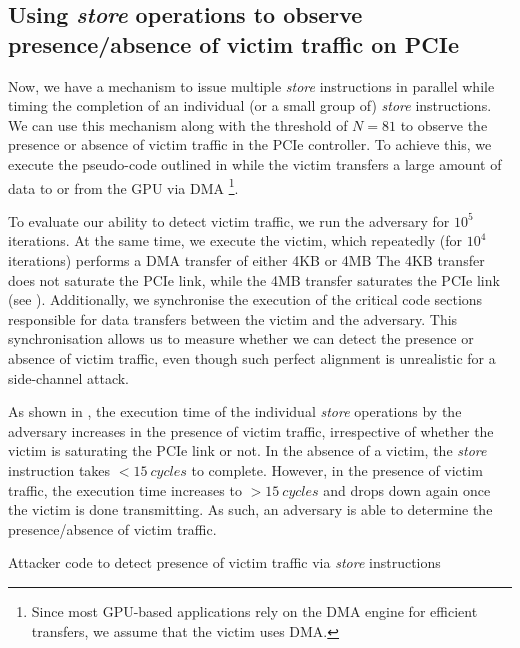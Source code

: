 \subsection{Using \textit{store} operations to observe presence/absence of victim traffic on PCIe}
\label{subsec:interconnect-sc-store-ops-measuring-time}
Now, we have a mechanism to issue multiple \textit{store} instructions in parallel while timing the completion of an individual (or a small group of) \textit{store} instructions.
We can use this mechanism along with the threshold of $N = 81$ to observe the presence or absence of victim traffic in the PCIe controller.
To achieve this, we execute the pseudo-code outlined in  while the victim transfers a large amount of data to or from the GPU via DMA
\footnote{Since most GPU-based applications rely on the DMA engine for efficient transfers, we assume that the victim uses DMA.}.

To evaluate our ability to detect victim traffic, we run the adversary for $10^5$ iterations.
At the same time, we execute the victim, which repeatedly (for $10^4$ iterations) performs a DMA transfer of either 4KB or 4MB
The 4KB transfer does not saturate the PCIe link, while the 4MB transfer saturates the PCIe link (see ).
Additionally, we synchronise the execution of the critical code sections responsible for data transfers between the victim and the adversary. 
This synchronisation allows us to measure whether we can detect the presence or absence of victim traffic, even though such perfect alignment is unrealistic for a side-channel attack.

As shown in , the execution time of the individual \textit{store} operations by the adversary increases in the presence of victim traffic, irrespective of whether the victim is saturating the PCIe link or not.
In the absence of a victim, the \textit{store} instruction takes $<15~cycles$ to complete. However, in the presence of victim traffic, the execution time increases to $>15~cycles$ and drops down again once the victim is done transmitting.
As such, an adversary is able to determine the presence/absence of victim traffic.


\begin{minipage}{\textwidth}
    
    \captionsetup{type=lstlisting}
    \caption{Attacker code to detect presence of victim traffic via \textit{store} instructions}
    \label{lst:timing-victim-with-stores}
\end{minipage}

